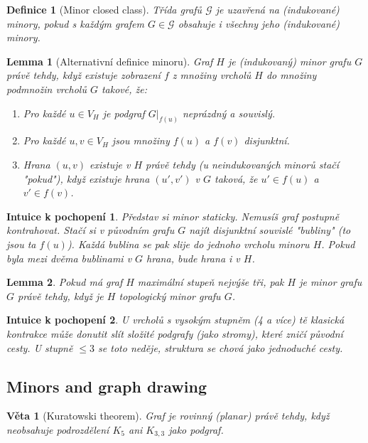 \documentclass[a4paper,11pt]{article}
\newtheorem{definition}{Definice}[section]
\newtheorem{theorem}{Věta}[section]
\newtheorem{lemma}{Lemma}[section]
\newtheorem*{intuition}{Intuice k pochopení}
\begin{document}
\begin{definition}[Minor closed class]
Třída grafů $\mathcal{G}$ je uzavřená na (indukované) minory, pokud s každým grafem $G \in \mathcal{G}$ obsahuje i všechny jeho (indukované) minory.
\end{definition}

\begin{lemma}[Alternativní definice minoru]
Graf $H$ je (indukovaný) minor grafu $G$ právě tehdy, když existuje zobrazení $f$ z množiny vrcholů $H$ do množiny podmnožin vrcholů $G$ takové, že:
\begin{enumerate}
    \item Pro každé $u \in V_H$ je podgraf $G|_{f(u)}$ neprázdný a souvislý.
    \item Pro každé $u, v \in V_H$ jsou množiny $f(u)$ a $f(v)$ disjunktní.
    \item Hrana $(u,v)$ existuje v $H$ právě tehdy (u neindukovaných minorů stačí "pokud"), když existuje hrana $(u', v')$ v $G$ taková, že $u' \in f(u)$ a $v' \in f(v)$.
\end{enumerate}
\end{lemma}

\begin{intuition}
Představ si minor staticky. Nemusíš graf postupně kontrahovat. Stačí si v původním grafu $G$ najít disjunktní souvislé "bubliny" (to jsou ta $f(u)$). Každá bublina se pak slije do jednoho vrcholu minoru $H$. Pokud byla mezi dvěma bublinami v $G$ hrana, bude hrana i v $H$.
\end{intuition}

\begin{lemma}
Pokud má graf $H$ maximální stupeň nejvýše tři, pak $H$ je minor grafu $G$ právě tehdy, když je $H$ topologický minor grafu $G$.
\end{lemma}

\begin{intuition}
U vrcholů s vysokým stupněm (4 a více) tě klasická kontrakce může donutit slít složité podgrafy (jako stromy), které zničí původní cesty. U stupně $\le 3$ se toto neděje, struktura se chová jako jednoduché cesty.
\end{intuition}

\subsection{Minors and graph drawing}

\begin{theorem}[Kuratowski theorem]
Graf je rovinný (planar) právě tehdy, když neobsahuje podrozdělení $K_5$ ani $K_{3,3}$ jako podgraf.
\end{theorem}
\end{document}
